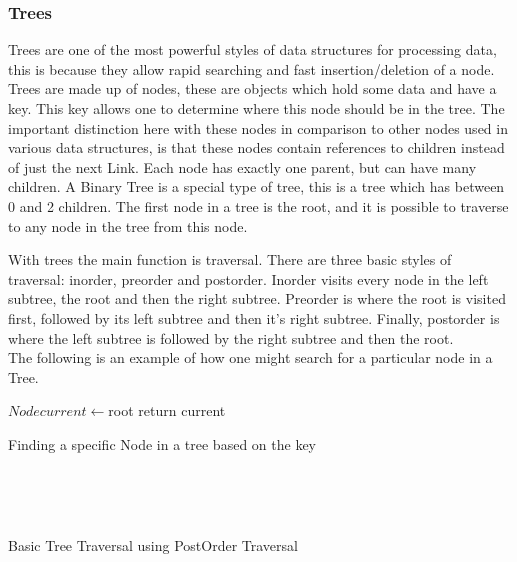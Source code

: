 \documentclass[10pt,twocolumn]{IEEEtran}
\begin{document}
	\subsubsection{Trees}
	Trees are one of the most powerful styles of data structures for processing data, this is because they allow rapid searching and fast insertion/deletion of a node. Trees are made up of nodes, these are objects which hold some data and have a key. This key allows one to determine where this node should be in the tree. The important distinction here with these nodes in comparison to other nodes used in various data structures, is that these nodes contain references to children instead of just the next Link. Each node has exactly one parent, but can have many children. A Binary Tree is a special type of tree, this is a tree which has between 0 and 2 children. The first node in a tree is the root, and it is possible to traverse to any node in the tree from this node.
	\par With trees the main function is traversal. There are three basic styles of traversal: inorder, preorder and postorder. Inorder visits every node in the left subtree, the root and then the right subtree. Preorder is where the root is visited first, followed by its left subtree and then it's right subtree. Finally, postorder is where the left subtree is followed by the right subtree and then the root. \\
The following is an example of how one might search for a particular node in a Tree.\\
\IncMargin{1em}
\begin{algorithm}
	\SetAlgoLined
	$Node current \longleftarrow$root\;
return current\;
\caption{Finding a specific Node in a tree based on the key}
\end{algorithm}\DecMargin{1em}
\\
\IncMargin{1em}
\begin{algorithm}
	\SetAlgoLined
	\Indm{}
	\\
\caption{Basic Tree Traversal using PostOrder Traversal}
\end{algorithm}\DecMargin{1em}
\end{document}

